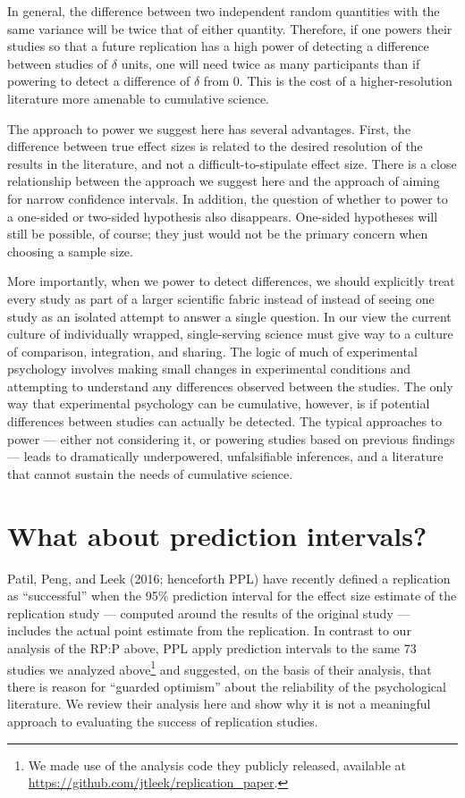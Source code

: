 \documentclass[doc,a4paper,floatsintext,draftfirst]{apa6}
\begin{document}
In general, the difference between two independent random quantities with the same variance will be twice that of either quantity. Therefore, if one powers their studies so that a future replication has a high power of detecting a difference between studies of $\delta$ units, one will need twice as many participants than if powering to detect a difference of $\delta$ from 0. This is the cost of a higher-resolution literature more amenable to cumulative science.

The approach to power we suggest here has several advantages. First, the difference between true effect sizes is related to the desired resolution of the results in the literature, and not a difficult-to-stipulate effect size. There is a close relationship between the approach we suggest here and the approach of aiming for narrow confidence intervals. In addition, the question of whether to power to a one-sided or two-sided hypothesis also disappears. One-sided hypotheses will still be possible, of course; they just would not be the primary concern when choosing a sample size.

More importantly, when we power to detect differences, we should explicitly treat every study as part of a larger scientific fabric instead of instead of seeing one study as an isolated attempt to answer a single question. In our view the current culture of individually wrapped, single-serving science must give way to a culture of comparison, integration, and sharing. The logic of much of experimental psychology involves making small changes in experimental conditions and attempting to understand any differences observed between the studies. The only way that experimental psychology can be cumulative, however, is if potential differences between studies can actually be detected. The typical approaches to power --- either not considering it, or powering studies based on previous findings --- leads to dramatically underpowered, unfalsifiable inferences, and a literature that cannot sustain the needs of cumulative science. 


\section{What about prediction intervals?}

Patil, Peng, and Leek (2016; henceforth PPL) have recently defined a replication as ``successful'' when the 95\% prediction interval for the effect size estimate of the replication study --- computed around the results of the original study --- includes the actual point estimate from the replication. In contrast to our analysis of the RP:P above, PPL apply prediction intervals to the same 73 studies we analyzed above\footnote{We made use of the analysis code they publicly released, available at \url{https://github.com/jtleek/replication_paper}.} and suggested, on the basis of their analysis, that there is reason for ``guarded optimism'' about the reliability of the psychological literature. We review their analysis here and show why it is not a meaningful approach to evaluating the success of replication studies.
\end{document}
